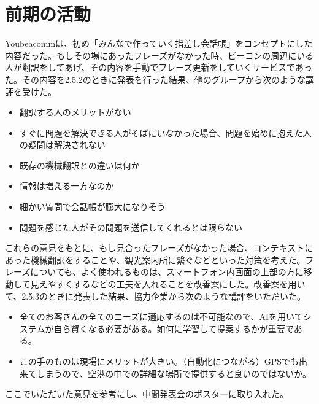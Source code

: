 \documentclass[openany,11pt,papersize]{jsbook}
\begin{document}
\section{前期の活動}
  Youbeacommは、初め「みんなで作っていく指差し会話帳」をコンセプトにした内容だった。もしその場にあったフレーズがなかった時、ビーコンの周辺にいる人が翻訳をしてあげ、その内容を手動でフレーズ更新をしていくサービスであった。その内容を2.5.2のときに発表を行った結果、他のグループから次のような講評を受けた。
\begin{itemize}
\item 翻訳する人のメリットがない
\item すぐに問題を解決できる人がそばにいなかった場合、問題を始めに抱えた人の疑問は解決されない
\item 既存の機械翻訳との違いは何か
\item 情報は増える一方なのか
\item 細かい質問で会話帳が膨大になりそう
\item 問題を感じた人がその問題を送信してくれるとは限らない
\end{itemize}
これらの意見をもとに、もし見合ったフレーズがなかった場合、コンテキストにあった機械翻訳をすることや、観光案内所に繋ぐなどといった対策を考えた。フレーズについても、よく使われるものは、スマートフォン内画面の上部の方に移動して見えやすくするなどの工夫を入れることを改善案にした。改善案を用いて、2.5.3のときに発表した結果、協力企業から次のような講評をいただいた。
\begin{itemize}
\item 全てのお客さんの全てのニーズに適応するのは不可能なので、AIを用いてシステムが自ら賢くなる必要がある。如何に学習して提案するかが重要である。
\item この手のものは現場にメリットが大きい。（自動化につながる）GPSでも出来てしまうので、空港の中での詳細な場所で提供すると良いのではないか。
\end{itemize}
ここでいただいた意見を参考にし、中間発表会のポスターに取り入れた。
\end{document}
